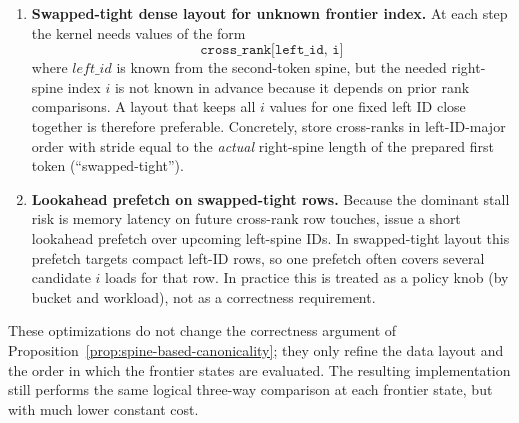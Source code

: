 \begin{enumerate}
    \item \textbf{Swapped-tight dense layout for unknown frontier index.} At each step the kernel
    needs values of the form
    \[
        \texttt{cross\_rank[left\_id, i]}
    \]
    where $left\_id$ is known from the second-token spine, but the needed right-spine index $i$ is
    not known in advance because it depends on prior rank comparisons. A layout that keeps all $i$
    values for one fixed left ID close together is therefore preferable. Concretely, store
    cross-ranks in left-ID-major order with stride equal to the \emph{actual} right-spine length of
    the prepared first token (``swapped-tight'').

    \item \textbf{Lookahead prefetch on swapped-tight rows.} Because the dominant stall risk is
    memory latency on future cross-rank row touches, issue a short lookahead prefetch over upcoming
    left-spine IDs. In swapped-tight layout this prefetch targets compact left-ID rows, so one
    prefetch often covers several candidate $i$ loads for that row. In practice this is treated as
    a policy knob (by bucket and workload), not as a correctness requirement.
\end{enumerate}

These optimizations do not change the correctness argument of
Proposition~\ref{prop:spine-based-canonicality}; they only refine the data layout and the order in
which the frontier states are evaluated. The resulting implementation still performs the same
logical three-way comparison at each frontier state, but with much lower constant cost.
